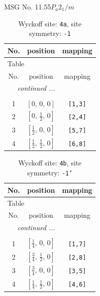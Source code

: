 \documentclass[fleqn,8pt]{jsarticle}
\begin{document}
\setcounter{MaxMatrixCols}{32}

\renewcommand{\tablename}{Table~}
\renewcommand{\figurename}{Figure~}
\begin{center}
\LARGE
MSG No. 11.55\quad$P_{a}2_{1}/m$
\end{center}
\renewcommand{\arraystretch}{1.2}
\begin{longtable}{ccc}
\caption{Wyckoff site: {\tt 4a}, site symmetry: {\tt -1}}
 \\
 \hline \hline
No. & position & mapping \\ \hline \endfirsthead

\multicolumn{2}{l}{\tablename\ \thetable{}} \\
 \hline \hline
No. & position & mapping \\ \hline \endhead

 \hline \hline
\multicolumn{2}{r}{\footnotesize\it continued ...} \\ \endfoot

 \hline \hline
\multicolumn{2}{r}{} \\ \endlastfoot

1 & $\left[ 0,\, 0,\, 0 \right]$ & {\tt [1,3]} \\ \hline
2 & $\left[ 0,\, \frac{1}{2},\, 0 \right]$ & {\tt [2,4]} \\ \hline
3 & $\left[ \frac{1}{2},\, 0,\, 0 \right]$ & {\tt [5,7]} \\ \hline
4 & $\left[ \frac{1}{2},\, \frac{1}{2},\, 0 \right]$ & {\tt [6,8]} \\
\end{longtable}
\renewcommand{\arraystretch}{1.2}
\begin{longtable}{ccc}
\caption{Wyckoff site: {\tt 4b}, site symmetry: {\tt -1'}}
 \\
 \hline \hline
No. & position & mapping \\ \hline \endfirsthead

\multicolumn{2}{l}{\tablename\ \thetable{}} \\
 \hline \hline
No. & position & mapping \\ \hline \endhead

 \hline \hline
\multicolumn{2}{r}{\footnotesize\it continued ...} \\ \endfoot

 \hline \hline
\multicolumn{2}{r}{} \\ \endlastfoot

1 & $\left[ \frac{1}{4},\, 0,\, 0 \right]$ & {\tt [1,7]} \\ \hline
2 & $\left[ \frac{3}{4},\, \frac{1}{2},\, 0 \right]$ & {\tt [2,8]} \\ \hline
3 & $\left[ \frac{3}{4},\, 0,\, 0 \right]$ & {\tt [3,5]} \\ \hline
4 & $\left[ \frac{1}{4},\, \frac{1}{2},\, 0 \right]$ & {\tt [4,6]} \\
\end{longtable}
\end{document}
